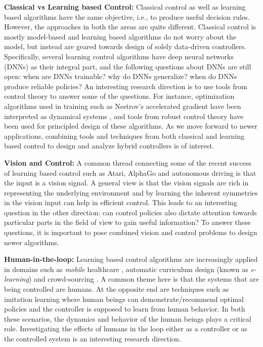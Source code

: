 \documentclass[onecolumn,12pt]{IEEEtran}
\begin{document}
 
 \textbf{Classical vs Learning based Control:} Classical control as well as learning based algorithms have the same objective, i.e., to produce useful decision rules. However, the approaches in both the areas are quite different. Classical control is mostly model-based and learning based algorithms do not worry about the model, but instead are geared towards design of solely data-driven controllers. Specifically, several learning control algorithms have deep neural networks (DNNs) as their integral part, and the following questions about DNNs are still open: when are DNNs trainable? why do DNNs generalize? when do DNNs produce reliable policies? An interesting research direction is to use tools from control theory to answer some of the questions. For instance, optimization algorithms used in training such as Nestrov's accelerated gradient have been interpreted as dynamical systems \cite{ben}, and tools from robust control theory have been used for principled design of these algorithms. As we move forward to newer applications, combining tools and techniques from both classical and learning based control to design and analyze hybrid controllers is of interest.
 
 \textbf{Vision and Control:} A common thread connecting some of the recent success of learning based control such as Atari, AlphaGo and autonomous driving is that the input is a vision signal.  A general view is that the vision signals are rich in representing the underlying environment and by learning the inherent symmetries in the vision input can help in efficient control. This leads to an interesting question \cite{vision} in the other direction: can control policies also dictate attention towards particular parts in the field of view to gain useful information? To answer these questions, it is important to pose combined vision and control problems to design newer algorithms.

 \textbf{Human-in-the-loop:} Learning based control algorithms are increasingly applied in domains such as \emph{mobile} healthcare \cite{mhealth}, automatic curriculum design (known as \emph{e-learning}) and crowd-sourcing \cite{crowd}. A common theme here is that the systems that are being controlled are humans. At the opposite end are techniques such as imitation learning \cite{il} where human beings can demonstrate/recommend optimal policies and the controller is supposed to learn from human behavior. In both these scenarios, the dynamics and behavior of the human beings plays a critical role. Investigating the effects of humans in the loop either as a controller or as the controlled system is an interesting research direction.
 
\end{document}
